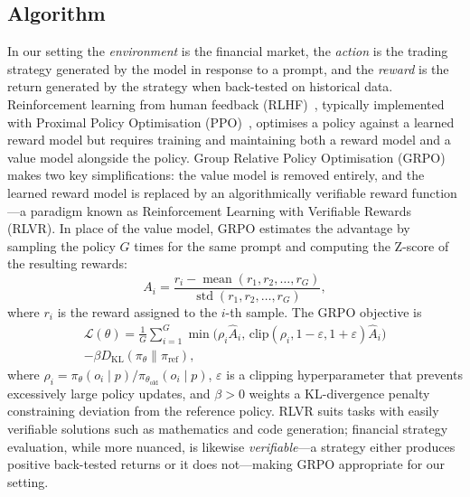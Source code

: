 \documentclass[conference,a4paper]{IEEEtran}
\begin{document}
\subsection{Algorithm}
\label{sec:algorithm}

In our setting the \emph{environment} is the financial market,
the \emph{action} is the trading strategy generated by the model in response to a prompt,
and the \emph{reward} is the return generated by the strategy when back-tested on
historical data. Reinforcement learning from human feedback
(RLHF)~\cite{christiano2017rlhf}, typically implemented with Proximal Policy Optimisation
(PPO)~\cite{schulman2017ppo}, optimises a policy against a learned reward model but
requires training and maintaining both a reward model and a value model alongside the
policy. Group Relative Policy Optimisation (GRPO)~\cite{shao2024deepseekmath} makes two
key simplifications: the value model is removed entirely, and the learned reward model is
replaced by an algorithmically verifiable reward function---a paradigm known as
Reinforcement Learning with Verifiable Rewards (RLVR). In place of the value model, GRPO estimates the advantage by sampling the
policy $G$ times for the same prompt and computing the Z-score of the resulting rewards:
\begin{equation}
  A_i = \frac{r_i - \operatorname{mean}(r_1, r_2, \ldots, r_G)}
             {\operatorname{std}(r_1, r_2, \ldots, r_G)},
  \label{eq:grpo-advantage}
\end{equation}
where $r_i$ is the reward assigned to the $i$-th sample. The GRPO objective is
\begin{multline}
  \mathcal{L}(\theta) = \tfrac{1}{G}\sum_{i=1}^{G}
    \min\!\bigl(\rho_i\hat{A}_i,\,
      \mathrm{clip}(\rho_i,1{-}\varepsilon,1{+}\varepsilon)\hat{A}_i\bigr) \\
    - \beta D_{\mathrm{KL}}(\pi_\theta\|\pi_{\mathrm{ref}}),
  \label{eq:grpo-obj}
\end{multline}
where $\rho_i = \pi_\theta(o_i \mid p)/\pi_{\theta_\text{old}}(o_i \mid p)$, $\varepsilon$
is a clipping hyperparameter that prevents excessively large policy updates, and
$\beta > 0$ weights a KL-divergence penalty constraining deviation from the reference
policy. RLVR suits tasks with easily verifiable solutions such as mathematics and code
generation; financial strategy evaluation, while more nuanced, is likewise
\emph{verifiable}---a strategy either produces positive back-tested returns or it does
not---making GRPO appropriate for our setting.
\end{document}
